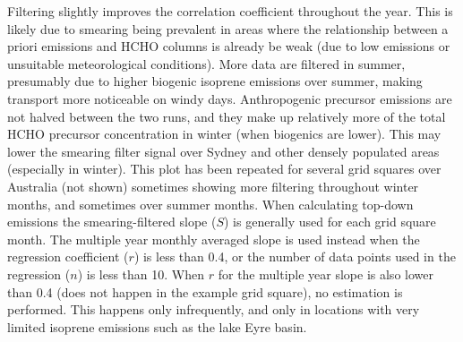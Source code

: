     Filtering slightly improves the correlation coefficient throughout the year.
    This is likely due to smearing being prevalent in areas where the relationship between a priori emissions and HCHO columns is already be weak (due to low emissions or unsuitable meteorological conditions).
    More data are filtered in summer, presumably due to higher biogenic isoprene emissions over summer, making transport more noticeable on windy days.
    Anthropogenic precursor emissions are not halved between the two runs, and they make up relatively more of the total HCHO precursor concentration in winter (when biogenics are lower).
    This may lower the smearing filter signal over Sydney and other densely populated areas (especially in winter).
    This plot has been repeated for several grid squares over Australia (not shown) sometimes showing more filtering throughout winter months, and sometimes over summer months.
    When calculating top-down emissions the smearing-filtered slope ($S$) is generally used for each grid square month.
    The multiple year monthly averaged slope is used instead when the regression coefficient ($r$) is less than 0.4, or the number of data points used in the regression ($n$) is less than 10.
    When $r$ for the multiple year slope is also lower than 0.4 (does not happen in the example grid square), no estimation is performed.%
    This happens only infrequently, and only in locations with very limited isoprene emissions such as the lake Eyre basin.
    
    
    
